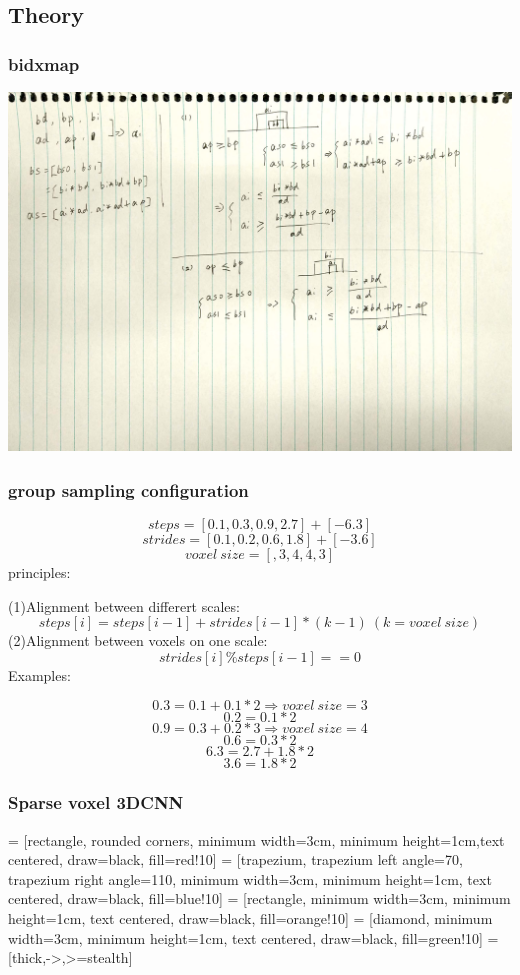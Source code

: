 \documentclass{article}
\begin{document}
\subsection{Theory}
\subsubsection{bidxmap}
\includegraphics[width=\textheight]{theory/bxmap.png}

\subsubsection{group sampling configuration}
$$ steps = [0.1,0.3,0.9,2.7] + [-6.3]$$
$$ strides = [0.1,0.2,0.6,1.8] + [-3.6] $$
$$ voxel\ size=[, 3, 4, 4, 3] $$
principles:\par
(1)Alignment between differert scales:
$$ steps[i] = steps[i-1]+strides[i-1]*(k-1)\  (k=voxel\ size) $$
(2)Alignment between voxels on one scale:
$$ strides[i] \% steps[i-1] == 0 $$
Examples:\par
$$ 0.3=0.1+0.1*2 \Rightarrow voxel\ size=3 $$
$$ 0.2=0.1*2 $$
$$ 0.9=0.3+0.2*3 \Rightarrow voxel\ size=4 $$ 
$$ 0.6=0.3*2 $$
$$$$
$$ 6.3=2.7+1.8*2 $$
$$ 3.6=1.8*2 $$

\subsubsection{Sparse voxel 3DCNN }
 = [rectangle, rounded corners, minimum width=3cm, minimum height=1cm,text centered, draw=black, fill=red!10]
 = [trapezium, trapezium left angle=70, trapezium right angle=110, minimum width=3cm, minimum height=1cm, text centered, draw=black, fill=blue!10]
 = [rectangle, minimum width=3cm, minimum height=1cm, text centered, draw=black, fill=orange!10]
 = [diamond, minimum width=3cm, minimum height=1cm, text centered, draw=black, fill=green!10]
 = [thick,->,>=stealth]
\end{document}
